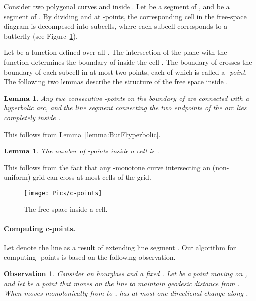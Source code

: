 \documentclass[12pt]{dalthesis}
\def\favoritefont{\bfseries \sffamily}
\def\QED{\ensuremath{{\Box}}}
\def\markatright#1{\leavevmode\unskip\nobreak\quad\hspace*{\fill}{#1}}
\newenvironment{proof}
	{\begin{trivlist}\item[\hskip\labelsep{\favoritefont Proof:}]}
	{\markatright{\QED}\end{trivlist}}
\newtheorem{lemma}[theorem]{Lemma}
\newtheorem{obs}{Observation}
\begin{document}
Consider two polygonal curves  and  inside .
Let  be a segment of ,
and  be a segment of .
By dividing  and  at -points,
the corresponding cell   in the free-space diagram 
is decomposed into  subcells,
where each subcell corresponds to a butterfly
(see Figure~\ref{fig:c-pointschains}).


Let  be a function
defined over all .
The intersection of the plane  with the function  determines the 
boundary of  inside the cell .
The boundary of  crosses the boundary of each subcell 
in at most two points, each of which is called a \emph{-point}.
The following two lemmas describe the structure of the free space inside  .

\begin{lemma}
	Any two consecutive -points on the boundary of  
	are connected with a hyperbolic arc, 
	and the line segment connecting the two endpoints of the arc lies completely inside .
\end{lemma}
\begin{proof}
	This follows from Lemma~\ref{lemma:ButFhyperbolic}.
\end{proof}

\begin{lemma}
	The number of -points inside a cell is . 
\end{lemma}
\begin{proof}
	This follows from the fact that 
any -monotone curve intersecting an  (non-uniform) grid 
	can cross at most  cells of the grid.
\end{proof}


\begin{figure}[h]
	\centering
	\texttt{[image: Pics/c-points]}
	\caption{ The free space inside a cell. }
	\label{fig:c-pointschains}
\end{figure}


\paragraph{Computing c-points.}
Let  denote the line as a result of 
extending line segment .
Our algorithm for computing -points is based on the following observation.

\begin{obs} \label{lemma:shrinkexpand}
	Consider an hourglass  and a fixed .
	Let  be a point moving on ,
	and let  be a point that moves on the 
	line   to maintain 
	geodesic distance  from .
When  moves monotonically from  to ,  
	 has at most one directional change along .
\end{obs}
\end{document}
